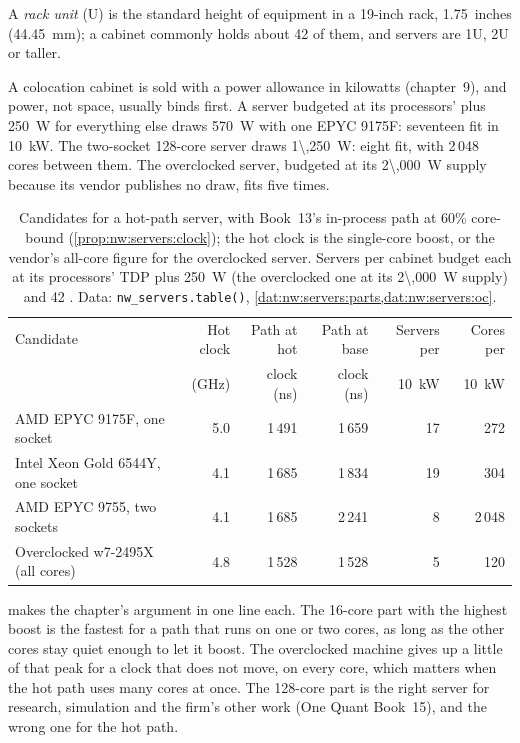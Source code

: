 \begin{definition}\label{def:nw:servers:ru}
A \emph{rack unit} (U) is the standard height of equipment in a 19-inch rack, 1.75~inches (44.45~mm); a cabinet commonly
holds about 42 of them, and servers are 1U, 2U or taller.
\end{definition}

A colocation cabinet is sold with a power allowance in kilowatts (chapter~9), and power, not space, usually binds first. A server budgeted at
its processors'  plus \qty{250}{\watt} for everything else draws \qty{570}{\watt} with one EPYC 9175F: seventeen fit in
\qty{10}{\kilo\watt}. The two-socket 128-core server draws \qty{1\,250}{\watt}: eight fit, with 2\,048 cores between them. The overclocked
server, budgeted at its \qty{2\,000}{\watt} supply because its vendor publishes no draw, fits five times.

\begin{table}[ht]
\centering\small
\begin{tabular}{lrrrrr}
\toprule
Candidate & Hot clock & Path at hot & Path at base & Servers per & Cores per \\
 & (GHz) & clock (ns) & clock (ns) & \qty{10}{\kilo\watt} & \qty{10}{\kilo\watt} \\
\midrule
AMD EPYC 9175F, one socket & 5.0 & 1\,491 & 1\,659 & 17 & 272 \\
Intel Xeon Gold 6544Y, one socket & 4.1 & 1\,685 & 1\,834 & 19 & 304 \\
AMD EPYC 9755, two sockets & 4.1 & 1\,685 & 2\,241 & 8 & 2\,048 \\
Overclocked w7-2495X (all cores) & 4.8 & 1\,528 & 1\,528 & 5 & 120 \\
\bottomrule
\end{tabular}
\caption{Candidates for a hot-path server, with Book~13's in-process path at 60\% core-bound (\cref{prop:nw:servers:clock}); the hot clock
is the single-core boost, or the vendor's all-core figure for the overclocked server. Servers per cabinet budget each at its processors'
TDP plus \qty{250}{\watt} (the overclocked one at its \qty{2\,000}{\watt} supply) and 42 . Data: \texttt{nw\_servers.table()},
\cref{dat:nw:servers:parts,dat:nw:servers:oc}.}\label{tab:nw:servers:candidates}
\end{table}

 makes the chapter's argument in one line each. The 16-core part with the highest boost is the fastest
for a path that runs on one or two cores, as long as the other cores stay quiet enough to let it boost. The overclocked machine gives up
a little of that peak for a clock that does not move, on every core, which matters when the hot path uses many cores at once. The
128-core part is the right server for research, simulation and the firm's other work (One Quant Book~15), and the wrong one for the hot
path.


